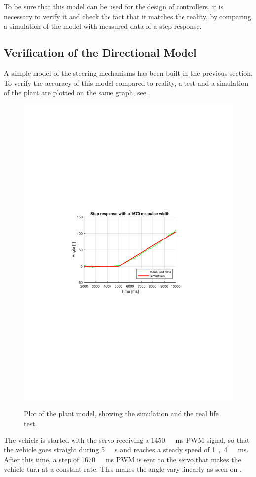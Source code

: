To be sure that this model can be used for the design of controllers, it is necessary to verify it and check the fact that it matches the reality, by comparing a simulation of the model with measured data of a step-response.

\subsection{Verification of the Directional Model}
A simple model of the steering mechanisms has been built in the previous section.
To verify the accuracy of this model compared to reality, a test and a simulation of the plant are plotted on the same graph, see .

\begin{figure}[H]
  \centering
   { \includegraphics[scale=1]{figures/plotVerificationSteeringPlant.pdf} }
 \caption{Plot of the plant model, showing the simulation and the real life test.}
  \label{fig:plotVerificationSteeringPlant}
\end{figure}
%
The vehicle is started with the servo receiving a \si{1450\ ms} PWM signal, so that the vehicle goes straight during \si{5\ s} and reaches a steady speed of \si{1,4\ ms}. 
After this time, a step of \si{1670\ ms} PWM is sent to the servo,that makes the vehicle turn at a constant rate. This makes the angle vary linearly as seen on .


